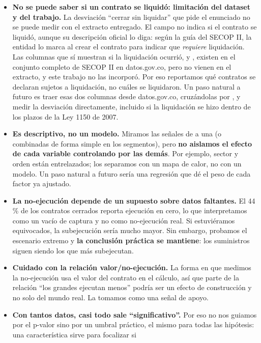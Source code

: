 \documentclass[11pt,a4paper]{article}
\begin{document}
\begin{itemize}
  \item \textbf{No se puede saber si un contrato se liquidó: limitación del dataset y del trabajo.} La desviación
    \enquote{cerrar sin liquidar} que pide el enunciado no se puede medir con el extracto entregado. El campo
     no indica si el contrato se liquidó, aunque su descripción oficial lo diga: según la guía del
    SECOP II, la entidad lo marca al crear el contrato para indicar que \emph{requiere} liquidación. Las columnas
    que sí muestran si la liquidación ocurrió,  y , existen
    en el conjunto completo de SECOP II en datos.gov.co, pero no vienen en el extracto, y este trabajo no las
    incorporó. Por eso reportamos qué contratos se declaran sujetos a liquidación, no cuáles se liquidaron. Un paso
    natural a futuro es traer esas dos columnas desde datos.gov.co, cruzándolas por , y medir la
    desviación directamente, incluido si la liquidación se hizo dentro de los plazos de la Ley 1150 de 2007.
  \item \textbf{Es descriptivo, no un modelo.} Miramos las señales de a una (o combinadas de forma simple en los
    segmentos), pero \textbf{no aislamos el efecto de cada variable controlando por las demás}. Por ejemplo,
    sector y orden están entrelazados; los separamos con un mapa de calor, no con un modelo. Un paso natural a
    futuro sería una regresión que dé el peso de cada factor ya ajustado.
  \item \textbf{La no-ejecución depende de un supuesto sobre datos faltantes.} El 44\,\% de los contratos
    cerrados reporta ejecución en cero, lo que interpretamos como un vacío de captura y no como no-ejecución
    real. Si estuviéramos equivocados, la subejecución sería mucho mayor. Sin embargo, probamos el escenario
    extremo y \textbf{la conclusión práctica se mantiene}: los suministros siguen siendo los que más subejecutan.
  \item \textbf{Cuidado con la relación valor/no-ejecución.} La forma en que medimos la no-ejecución usa el valor
    del contrato en el cálculo, así que parte de la relación \enquote{los grandes ejecutan menos} podría ser un
    efecto de construcción y no solo del mundo real. La tomamos como una señal de apoyo.
  \item \textbf{Con tantos datos, casi todo sale \enquote{significativo}.} Por eso no nos guiamos por el p-valor
    sino por un umbral práctico, el mismo para todas las hipótesis: una característica sirve para focalizar si

\end{itemize}
\end{document}
